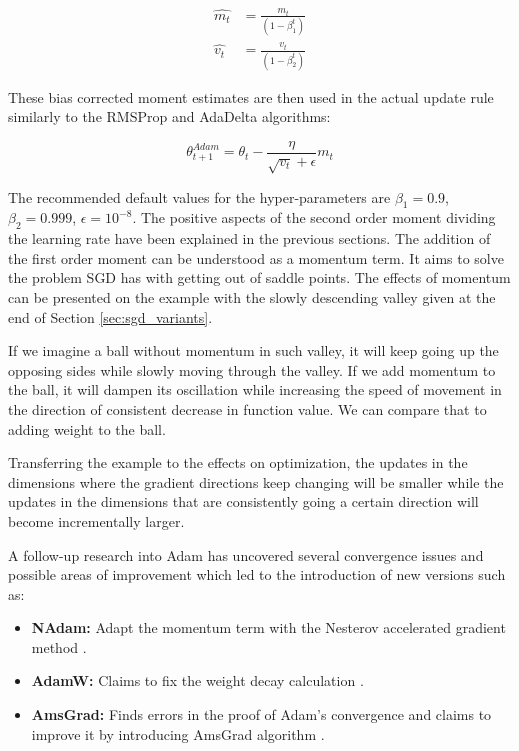 \documentclass[12pt, titlepage]{article}
\begin{document}
\begin{equation}\label{eq:adam_moments}
\begin{aligned}
\hat{m_t} &= \frac{m_t}{(1 - \beta_1^t)}\\
\hat{v_t} &= \frac{v_t}{(1 - \beta_2^t)}
\end{aligned}
\end{equation}


These bias corrected moment estimates are then used in the actual update rule similarly to the RMSProp and AdaDelta algorithms:

\begin{equation}\label{eq:adam_update}
\theta_{t+1}^{Adam} = \theta_{t} - \frac{\eta}{\sqrt{v_t} + \epsilon} m_t
\end{equation}

The recommended default values for the hyper-parameters are $\beta_1 = 0.9$, $\beta_2 = 0.999$, $\epsilon = 10^{-8}$.
The positive aspects of the second order moment dividing the learning rate have been explained in the previous sections. The addition of the first order moment can be understood as a momentum term. It aims to solve the problem SGD has with getting out of saddle points. 
The effects of momentum can be presented on the example with the slowly descending valley given at the end of Section \ref{sec:sgd_variants}. 

If we imagine a ball without momentum in such valley, it will keep going up the opposing sides while slowly moving through the valley. If we add momentum to the ball, it will dampen its oscillation while increasing the speed of movement in the direction of consistent decrease in function value. We can compare that to adding weight to the ball. 

Transferring the example to the effects on optimization, the updates in the dimensions where the gradient directions keep changing will be smaller while the updates in the dimensions that are consistently going a certain direction will become incrementally larger.

A follow-up research into Adam has uncovered several convergence issues and possible areas of improvement which led to the introduction of new versions such as:

\begin{itemize} 
\item \textbf{NAdam:} Adapt the momentum term with the Nesterov accelerated gradient method \cite{dozat2016incorporating}.
\item \textbf{AdamW:} Claims to fix the weight decay calculation \cite{loshchilov2017fixing}.
\item \textbf{AmsGrad:} Finds errors in the proof of Adam's convergence and claims to improve it by introducing AmsGrad algorithm \cite{reddi2018convergence}.
\end{itemize}
\end{document}
